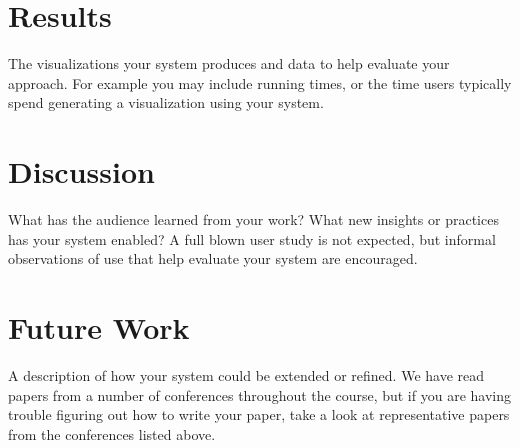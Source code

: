 \documentclass{chi2009}
\begin{document}
\section{Results}

The visualizations your system produces and data to help evaluate your approach. For example you may include running times, or the time users typically spend generating a visualization using your system.

\section{Discussion}

What has the audience learned from your work? What new insights or practices has your system enabled? A full blown user study is not expected, but informal observations of use that help evaluate your system are encouraged.

\section{Future Work}

A description of how your system could be extended or refined. We have read papers from a number of conferences throughout the course, but if you are having trouble figuring out how to write your paper, take a look at representative papers from the conferences listed above.



\end{document}

